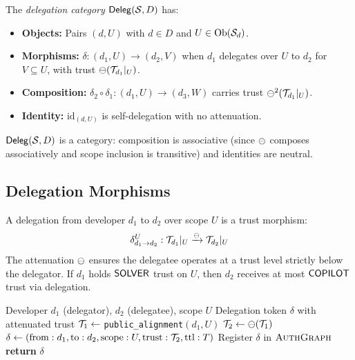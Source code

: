 \documentclass[11pt]{article}
\newcommand{\AuthGraph}{\textsc{AuthGraph}}
\newcommand{\id}{\mathrm{id}}
\newcommand{\DelegCat}{\mathsf{Deleg}}
\begin{document}
\begin{definition}
The \emph{delegation category} $\DelegCat(\Site, D)$ has:
\begin{itemize}
  \item \textbf{Objects:} Pairs $(d, U)$ with $d \in D$ and
        $U \in \mathrm{Ob}(\mathcal{S}_d)$.
  \item \textbf{Morphisms:} $\delta : (d_1, U) \to (d_2, V)$ when $d_1$
        delegates over $U$ to $d_2$ for $V \subseteq U$, with trust
        $\ominus(\mathcal{T}_{d_1}|_U)$.
  \item \textbf{Composition:} $\delta_2 \circ \delta_1 : (d_1, U) \to (d_3, W)$
        carries trust $\ominus^2(\mathcal{T}_{d_1}|_U)$.
  \item \textbf{Identity:} $\id_{(d,U)}$ is self-delegation with no attenuation.
\end{itemize}
\end{definition}

\begin{proposition}
$\DelegCat(\Site, D)$ is a category: composition is associative (since
$\ominus$ composes associatively and scope inclusion is transitive) and
identities are neutral.
\end{proposition}

\subsection{Delegation Morphisms}

A delegation from developer $d_1$ to $d_2$ over scope $U$ is a trust morphism:
\[
  \delta_{d_1 \to d_2}^U : \mathcal{T}_{d_1}|_U \xrightarrow{\ominus}
  \mathcal{T}_{d_2}|_U
\]
The attenuation $\ominus$ ensures the delegatee operates at a trust level
strictly below the delegator. If $d_1$ holds $\mathsf{SOLVER}$ trust on $U$, then
$d_2$ receives at most $\mathsf{COPILOT}$ trust via delegation.

\begin{algorithm}[t]
\caption{Authority Delegation via \texttt{public\_alignment}}
\label{alg:delegation}
\begin{algorithmic}[1]
\REQUIRE Developer $d_1$ (delegator), $d_2$ (delegatee), scope $U$
\ENSURE Delegation token $\delta$ with attenuated trust
\STATE $\mathcal{T}_1 \gets$ \texttt{public\_alignment}$(d_1, U)$
\STATE $\mathcal{T}_2 \gets \ominus(\mathcal{T}_1)$ 
\STATE $\delta \gets (\text{from}: d_1, \text{to}: d_2, \text{scope}: U,
       \text{trust}: \mathcal{T}_2, \text{ttl}: T)$
\STATE Register $\delta$ in $\AuthGraph$
\STATE \textbf{return} $\delta$
\end{algorithmic}
\end{algorithm}
\end{document}
